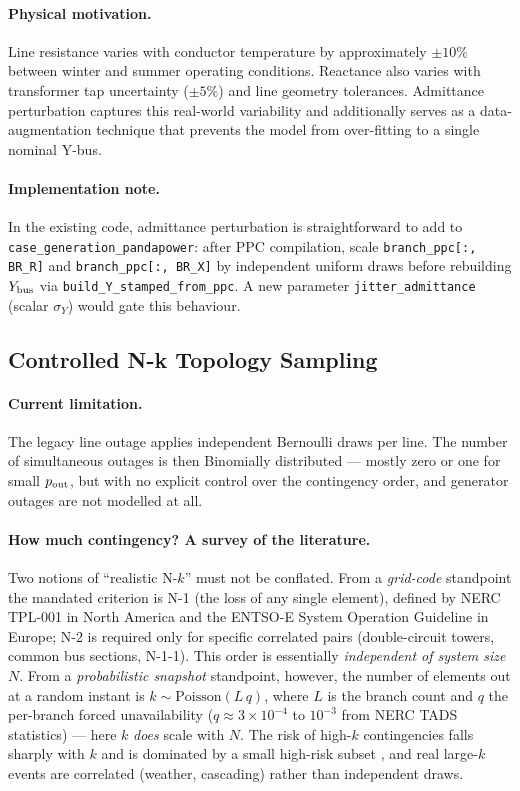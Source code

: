 \documentclass{article}
\begin{document}
\paragraph{Physical motivation.}
Line resistance varies with conductor temperature by approximately
$\pm 10\%$ between winter and summer operating conditions.  Reactance also
varies with transformer tap uncertainty ($\pm 5\%$) and line geometry
tolerances.  Admittance perturbation captures this real-world variability and
additionally serves as a data-augmentation technique that prevents the model
from over-fitting to a single nominal Y-bus.

\paragraph{Implementation note.}
In the existing code, admittance perturbation is straightforward to add to
\texttt{case\_generation\_pandapower}: after PPC compilation, scale
\texttt{branch\_ppc[:, BR\_R]} and \texttt{branch\_ppc[:, BR\_X]} by
independent uniform draws before rebuilding $Y_{\rm bus}$ via
\texttt{build\_Y\_stamped\_from\_ppc}.  A new parameter
\texttt{jitter\_admittance} (scalar $\sigma_Y$) would gate this behaviour.

\subsection{Controlled N-k Topology Sampling}
\label{sec:contingency}

\paragraph{Current limitation.}
The legacy line outage applies independent Bernoulli draws per line.  The
number of simultaneous outages is then Binomially distributed --- mostly zero or
one for small $p_{\rm out}$, but with no explicit control over the contingency
order, and generator outages are not modelled at all.

\paragraph{How much contingency? A survey of the literature.}
Two notions of ``realistic N-$k$'' must not be conflated.  From a
\emph{grid-code} standpoint the mandated criterion is N-1 (the loss of any
single element), defined by NERC TPL-001 \cite{nerc_tpl} in North America and
the ENTSO-E System Operation Guideline in Europe; N-2 is required only for
specific correlated pairs (double-circuit towers, common bus sections,
N-1-1).  This order is essentially \emph{independent of system size} $N$.
From a \emph{probabilistic snapshot} standpoint, however, the number of
elements out at a random instant is $k \sim \mathrm{Poisson}(L\,q)$, where $L$
is the branch count and $q$ the per-branch forced unavailability
($q \approx 3\times10^{-4}$ to $10^{-3}$ from NERC TADS statistics) --- here $k$
\emph{does} scale with $N$.  The risk of high-$k$ contingencies falls sharply
with $k$ and is dominated by a small high-risk subset \cite{chen2005nk}, and
real large-$k$ events are correlated (weather, cascading) rather than
independent draws.
\end{document}
